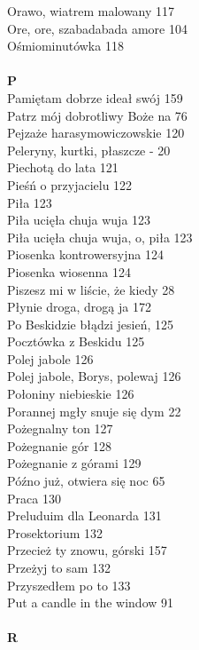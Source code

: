 \documentclass[a5paper, 10pt]{book}
\begin{document}
{\begin{multicols}{3}
    Orawo, wiatrem malowany 117\\
    Ore, ore, szabadabada amore 104\\
    Ośmiominutówka 118\\
    \\
    {\footnotesize \textbf{P\\} }
    Pamiętam dobrze ideał swój 159\\
    Patrz mój dobrotliwy Boże na 76\\
    Pejzaże harasymowiczowskie 120\\
    Peleryny, kurtki, płaszcze - 20\\
    Piechotą do lata 121\\
    Pieśń o przyjacielu 122\\
    Piła 123\\
    Piła ucięła chuja wuja 123\\
    Piła ucięła chuja wuja, o, piła 123\\
    Piosenka kontrowersyjna 124\\
    Piosenka wiosenna 124\\
    Piszesz mi w liście, że kiedy 28\\
    Płynie droga, drogą ja 172\\
    Po Beskidzie błądzi jesień, 125\\
    Pocztówka z Beskidu 125\\
    Polej jabole 126\\
    Polej jabole, Borys, polewaj 126\\
    Połoniny niebieskie 126\\
    Porannej mgły snuje się dym 22\\
    Pożegnalny ton 127\\
    Pożegnanie gór 128\\
    Pożegnanie z górami 129\\
    Późno już, otwiera się noc 65\\
    Praca 130\\
    Preluduim dla Leonarda 131\\
    Prosektorium 132\\
    Przecież ty znowu, górski 157\\
    Przeżyj to sam 132\\
    Przyszedłem po to 133\\
    Put a candle in the window 91\\
    \\
    {\footnotesize \textbf{R\\} }

\end{multicols}}
\end{document}
